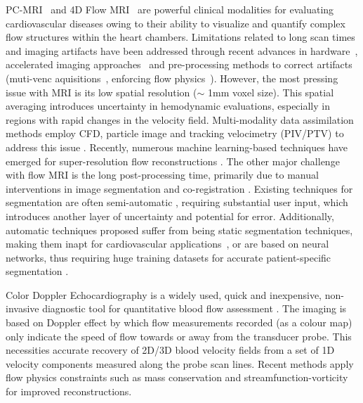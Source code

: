 PC-MRI~\cite{pelc1991_PCMRI} and 4D Flow MRI~\cite{markl2014_4d} are powerful clinical modalities for evaluating cardiovascular diseases owing to their ability to visualize and quantify complex flow structures within the heart chambers\cite{Nayak2015_PCMRI,maroun2023_4D}. Limitations related to long scan times and imaging artifacts have been addressed through recent advances in hardware~\cite{Stankovic2014_4Dreview}, accelerated imaging approaches~\cite{soulat2020_4Dreview} and pre-processing methods to correct artifacts (muti-venc aquisitions~\cite{Schnell2017_4Ddualvenc,ha2016_4Dmultivenc}, enforcing flow physics~\cite{zhang2021_4Dphaseunwrap}). However, the most pressing issue with MRI is its low spatial resolution ($\sim$ 1mm voxel size). This spatial averaging introduces uncertainty in hemodynamic evaluations, especially in regions with rapid changes in the velocity field. Multi-modality data assimilation methods employ CFD, particle image and tracking velocimetry (PIV/PTV) to address this issue \cite{bakhshinejad2017_4DmriCFD, zhang2022_4Dsparserep}. Recently, numerous machine learning-based techniques have emerged for super-resolution flow reconstructions \cite{Ferdien2020_4DFlowNN,Rutkowski2021_4DFlowNN,Arzani2022_CardioML}. The other major challenge with flow MRI is the long post-processing time, primarily due to manual interventions in image segmentation and co-registration \cite{zhuang2021_4Dreview}. Existing techniques for segmentation are often semi-automatic \cite{yushkevich2006_ITKSNAP}, requiring substantial user input, which introduces another layer of uncertainty and potential for error. Additionally, automatic techniques proposed suffer from being static segmentation techniques, making them inapt for cardiovascular applications~\cite{rothenberger2023_4DflowSDM}, or are based on neural networks, thus requiring huge training datasets for accurate patient-specific segmentation \cite{berhane2020_4Dseg,ziegler2021_MRIseg}.

Color Doppler Echocardiography is a widely used, quick and inexpensive, non-invasive diagnostic tool for quantitative blood flow assessment \cite{cohen1996_echo}.  The imaging is based on Doppler effect by which flow measurements recorded (as a colour map) only indicate the speed of flow towards or away from the transducer probe. This necessities accurate recovery of 2D/3D blood velocity fields from a set of 1D velocity components measured along the probe scan lines. Recent methods apply flow physics constraints such as mass conservation \cite{garcia2010_EchoIVFM,assi2017_EchoIVFM} and streamfunction-vorticity \cite{ brett2020_echo} for improved reconstructions.

